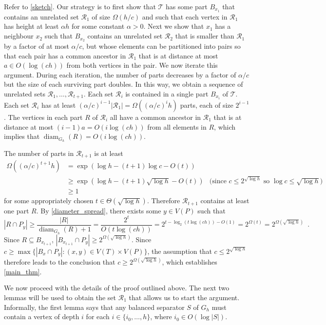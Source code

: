 \documentclass{patmorin}
\DeclareMathOperator{\diam}{diam}
\renewcommand{\le}{\leqslant}
\renewcommand{\ge}{\geqslant}
\begin{document}
Refer to \cref{sketch}.
Our strategy is to first show that $\mathcal{T}$ has some part $B_{x_1}$ that contains an unrelated set $\mathcal{R}_1$ of size $\Omega(h/c)$ and such that each vertex in $\mathcal{R}_1$ has height at least $\alpha h$ for some constant $\alpha>0$.  Next we show that $x_1$ has a neighbour $x_2$ such that $B_{x_2}$ contains an unrelated set $\mathcal{R}_2$ that is smaller than $\mathcal{R}_1$ by a factor of at most $\alpha/c$, but whose elements can be partitioned into pairs so that each pair has a common ancestor in $\mathcal{R}_1$ that is at distance at most $a\in O(\log(ch))$ from both vertices in the pair.  We now iterate this argument.  During each iteration, the number of parts decreases by a factor of $\alpha/c$ but the size of each surviving part doubles.  In this way, we obtain a sequence of unrelated sets $\mathcal{R}_1,\ldots,\mathcal{R}_{t+1}$. Each set $\mathcal{R}_i$ is contained in a single part $B_{x_i}$ of $\mathcal{T}$.  Each set $\mathcal{R}_i$ has at least $(\alpha/c)^{i-1}|\mathcal{R}_1|=\Omega((\alpha/c)^{i} h)$ parts, each of size $2^{i-1}$.   The vertices in each part $R$ of $\mathcal{R}_i$ all have a common ancestor in $\mathcal{R}_1$ that is at distance at most $(i-1)a=O(i\log(ch))$ from all elements in $R$, which implies that $\diam_{G_h}(R)=O(i\log(ch))$.

The number of parts in $\mathcal{R}_{t+1}$ is at least
\begin{align*}
  \Omega((\alpha/c)^{t+1} h)
  & = \exp(\log h - (t+1)\log c - O(t)) \\
  & \ge \exp(\log h - (t+1)\sqrt{\log h} - O(t))
    & \text{(since $c\le 2^{\sqrt{\log h}}$ so $\log c\le \sqrt{\log h}$)} \\
  & \ge 1
\end{align*}
for some appropriately chosen $t\in \Theta(\sqrt{\log h})$.  Therefore $\mathcal{R}_{t+1}$ contains at least one part $R$. By \cref{diameter_spread}, there exists some $y \in V(P)$ such that
\[
  |R\cap P_y| \ge \frac{|R|}{\diam_{G_h}(R)+1} = \frac{2^t}{O(t\log(ch))}
  = 2^{t-\log_2(t\log(ch))-O(1)} = 2^{\Omega(t)} = 2^{\Omega(\sqrt{\log h})} \enspace .
\]
Since $R\subseteq B_{x_{t+1}}$, $|B_{x_{t+1}}\cap P_y|\ge 2^{\Omega(\sqrt{\log h})}$.  Since $c\ge \max\{|B_x\cap P_y|:(x,y)\in V(T)\times V(P)\}$, the assumption that $c\le 2^{\sqrt{\log h}}$ therefore leads to the conclusion that $c\ge 2^{\Omega(\sqrt{\log h})}$, which establishes \cref{main_thm}.

We now proceed with the details of the proof outlined above.  The next two lemmas will be used to obtain the set $\mathcal{R}_1$ that allows us to start the argument.  Informally, the first lemma says that any balanced separator $S$ of $G_h$ must contain a vertex of depth $i$ for each $i\in\{i_0,\ldots,h\}$, where $i_0\in O(\log|S|)$.
\end{document}
